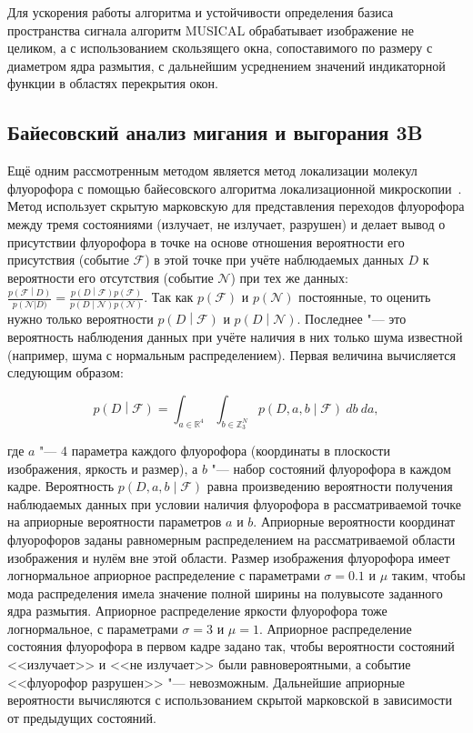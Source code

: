 Для ускорения работы алгоритма и устойчивости определения базиса пространства сигнала алгоритм MUSICAL обрабатывает изображение не целиком, а с использованием скользящего окна, сопоставимого по размеру с диаметром ядра размытия, с дальнейшим усреднением значений индикаторной функции в областях перекрытия окон.

\subsection{Байесовский анализ мигания и выгорания 3B}

Ещё одним рассмотренным методом является метод локализации молекул флуорофора с помощью байесовского алгоритма локализационной микроскопии~\cite{cox2012bayesian}. Метод использует скрытую марковскую  для представления переходов флуорофора между тремя состояниями (излучает, не излучает, разрушен) и делает вывод о присутствии флуорофора в точке на основе отношения вероятности его присутствия (событие $\mathcal{F}$) в этой точке при учёте наблюдаемых данных $D$ к вероятности его отсутствия (событие $\mathcal{N}$) при тех же данных: $\frac{p\left(\mathcal{F}\middle| D\right)}{p\left(\mathcal{N}\right|D)} = \frac{p\left(D\middle|\mathcal{F}\right)p\left(\mathcal{F}\right)} {p\left(D\middle|\mathcal{N}\right)p\left(\mathcal{N}\right)}$. Так как $p\left(\mathcal{F}\right)$ и $p\left(\mathcal{N}\right)$ постоянные, то оценить нужно только вероятности $p\left(D\middle|\mathcal{F}\right)$ и $p\left(D\middle|\mathcal{N}\right)$. Последнее "--- это вероятность наблюдения данных при учёте наличия в них только шума известной  (например, шума с нормальным распределением). Первая величина вычисляется следующим образом:

\begin{equation*}
	p\left(D\middle|\mathcal{F}\right)=\int_{a\in\mathbb{R}^4}\int_{b\in\mathbb{Z}_3^N}{p\left(D,a,b\middle|\mathcal{F}\right)\ db\ da},
\end{equation*}

\noindent где $a$ "--- 4 параметра каждого флуорофора (координаты в плоскости изображения, яркость и размер), а $b$ "--- набор состояний флуорофора в каждом кадре. Вероятность $p\left(D,a,b\middle|\mathcal{F}\right)$ равна произведению вероятности получения наблюдаемых данных при условии наличия флуорофора в рассматриваемой точке на априорные вероятности параметров $a$ и $b$. Априорные вероятности координат флуорофоров заданы равномерным распределением на рассматриваемой области изображения и нулём вне этой области. Размер изображения флуорофора имеет логнормальное априорное распределение с параметрами $\sigma=0.1$ и $\mu$ таким, чтобы мода распределения имела значение полной ширины на полувысоте заданного ядра размытия. Априорное распределение яркости флуорофора тоже логнормальное, с параметрами $\sigma=3$ и $\mu=1$. Априорное распределение состояния флуорофора в первом кадре задано так, чтобы вероятности состояний <<излучает>> и <<не излучает>> были равновероятными, а событие <<флуорофор разрушен>> "--- невозможным. Дальнейшие априорные вероятности вычисляются с использованием скрытой марковской  в зависимости от предыдущих состояний.

